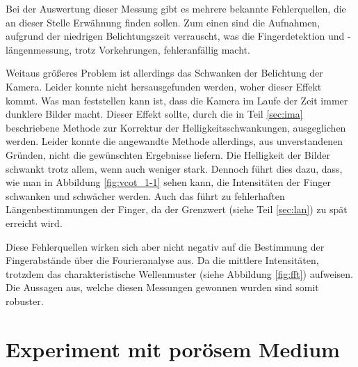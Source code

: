 Bei der Auswertung dieser Messung gibt es mehrere bekannte Fehlerquellen, die an dieser Stelle Erwähnung finden sollen. Zum einen sind die Aufnahmen, aufgrund der niedrigen Belichtungszeit verrauscht, was die Fingerdetektion und -längenmessung, trotz Vorkehrungen, fehleranfällig macht.

Weitaus größeres Problem ist allerdings das Schwanken der Belichtung der Kamera. Leider konnte nicht hersausgefunden werden, woher dieser Effekt kommt. Was man feststellen kann ist, dass die Kamera im Laufe der Zeit immer dunklere Bilder macht. Dieser Effekt sollte, durch die in Teil \ref{sec:ima} beschriebene Methode zur Korrektur der Helligkeitsschwankungen, ausgeglichen werden. Leider konnte die angewandte Methode allerdings, aus unverstandenen Gründen, nicht die gewünschten Ergebnisse liefern. Die Helligkeit der Bilder schwankt trotz allem, wenn auch weniger stark. Dennoch führt dies dazu, dass, wie man in Abbildung \ref{fig:vcot_1-1} sehen kann, die Intensitäten der Finger schwanken und schwächer werden. Auch das führt zu fehlerhaften Längenbestimmungen der Finger, da der Grenzwert (siehe Teil \ref{sec:lan}) zu spät erreicht wird.

Diese Fehlerquellen wirken sich aber nicht negativ auf die Bestimmung der Fingerabstände über die Fourieranalyse aus. Da die mittlere Intensitäten, trotzdem das charakteristische Wellenmuster (siehe Abbildung \ref{fig:fft}) aufweisen. Die Aussagen aus, welche diesen Messungen gewonnen wurden sind somit robuster.



% 
% 


\newpage

\section{\COTm Experiment mit porösem Medium}
\label{res:cpm}



